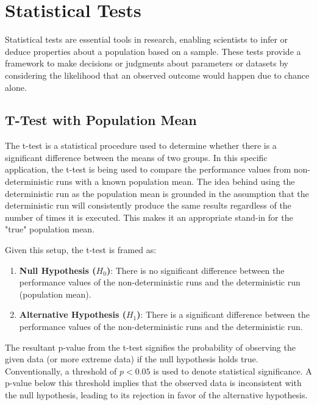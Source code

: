 \clearpage




\section{Statistical Tests} 

Statistical tests are essential tools in research, enabling scientists to infer or deduce properties about a population based on a sample. These tests provide a framework to make decisions or judgments about parameters or datasets by considering the likelihood that an observed outcome would happen due to chance alone.

\subsection{T-Test with Population Mean} 
The t-test is a statistical procedure used to determine whether there is a significant difference between the means of two groups. In this specific application, the t-test is being used to compare the performance values from non-deterministic runs with a known population mean.
The idea behind using the deterministic run as the population mean is grounded in the assumption that the deterministic run will consistently produce the same results regardless of the number of times it is executed. This makes it an appropriate stand-in for the "true" population mean.

Given this setup, the t-test is framed as:

\begin{enumerate}
    \item \textbf{Null Hypothesis ($H_0$)}: There is no significant difference between the performance values of the non-deterministic runs and the deterministic run (population mean).
    \item \textbf{Alternative Hypothesis ($H_1$)}: There is a significant difference between the performance values of the non-deterministic runs and the deterministic run.
\end{enumerate}

The resultant p-value from the t-test signifies the probability of observing the given data (or more extreme data) if the null hypothesis holds true. Conventionally, a threshold of $p < 0.05$ is used to denote statistical significance. A p-value below this threshold implies that the observed data is inconsistent with the null hypothesis, leading to its rejection in favor of the alternative hypothesis.

